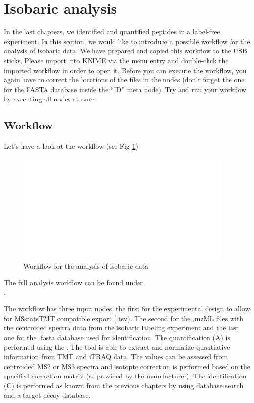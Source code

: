 

\newpage
\section{Isobaric analysis}
In the last chapters, we identified and quantified peptides in a label-free experiment. In this section, we would like to introduce a possible workflow for the analysis of isobaric data. We have prepared and copied this workflow to the USB sticks. Please import  into KNIME via the menu entry  and double-click the imported workflow in order to open it. Before you can execute the workflow, you again have to correct the locations of the files in the  nodes (don't forget the one for the FASTA database inside the ``ID'' meta node). Try and run your workflow by executing all nodes at once.


\subsection{Workflow}
Let's have a look at the workflow (see Fig \ref{fig:isobaric_wf})

\begin{figure}[htbp]
  \centering
  \includegraphics[width=0.95\textwidth]{graphics/isobaric/MSstatsTMT_export.png}
  \caption{Workflow for the analysis of isobaric data}
  \label{fig:isobaric_wf}
\end{figure}

\noindent The full analysis workflow can be found under\\
.

The workflow has three input nodes, the first for the experimental design to allow for MSstatsTMT compatible export (.tsv). The second for the .mzML files with the centroided spectra data from the isobaric labeling experiment and the last one for the .fasta database used for identification. The quantification (A) is performed using the . The tool is able to extract and normalize quantiative information from TMT and iTRAQ data. The values can be assessed from centroided MS2 or MS3 spectra and isotopte correction is performed based on the specified correction matrix (as provided by the manufacturer). The identification (C) is performed as known from the previous chapters by using database search and a target-decoy database.

